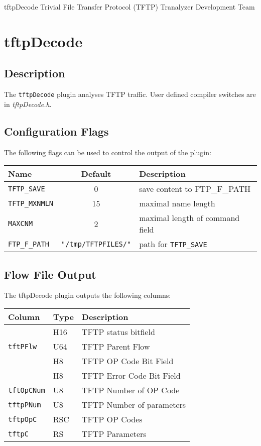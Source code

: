 \documentclass[documentation]{subfiles}
\begin{document}
\trantitle
    {tftpDecode}
    {Trivial File Transfer Protocol (TFTP)}
    {Tranalyzer Development Team} %

\section{tftpDecode}\label{s:tftpDecode}

\subsection{Description}
The {\tt tftpDecode} plugin analyses TFTP traffic. User defined compiler switches are in {\em tftpDecode.h}.

\subsection{Configuration Flags}
The following flags can be used to control the output of the plugin:
\begin{longtable}{lcl}
    \toprule
    {\bf Name} & {\bf Default} & {\bf Description} \\
    \midrule\endhead%
    {\tt TFTP\_SAVE}   &  0 & save content to FTP\_F\_PATH \\
    {\tt TFTP\_MXNMLN} & 15 & maximal name length  \\
    {\tt MAXCNM}       &  2 & maximal length of command field \\
    {\tt FTP\_F\_PATH} & {\tt\small "/tmp/TFTPFILES/"} & path for {\tt TFTP\_SAVE} \\
    \bottomrule
\end{longtable}

\subsection{Flow File Output}
The tftpDecode plugin outputs the following columns:
\begin{longtable}{lll}
    \toprule
    {\bf Column} & {\bf Type} & {\bf Description} \\
    \midrule\endhead%
    {\tt \nameref{tftpStat}} & H16 & TFTP status bitfield \\
    {\tt tftPFlw} & U64 & TFTP Parent Flow \\
    {\tt \nameref{tftpOpCBF}} & H8 & TFTP OP Code Bit Field \\
    {\tt \nameref{tftpErrCBF}} & H8 & TFTP Error Code Bit Field \\
    {\tt tftOpCNum} & U8 & TFTP Number of OP Code \\
    {\tt tftpPNum} & U8 & TFTP Number of parameters \\
    {\tt tftpOpC} & RSC & TFTP OP Codes \\
    {\tt tftpC} & RS & TFTP Parameters \\
    \bottomrule
\end{longtable}
\end{document}
